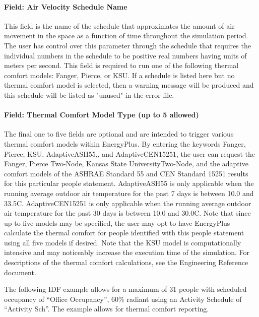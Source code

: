 \paragraph{Field: Air Velocity Schedule Name}\label{field-air-velocity-schedule-name}

This field is the name of the schedule that approximates the amount of air movement in the space as a function of time throughout the simulation period. The user has control over this parameter through the schedule that requires the individual numbers in the schedule to be positive real numbers having units of meters per second. This field is required to run one of the following thermal comfort models: Fanger, Pierce, or KSU. If a schedule is listed here but no thermal comfort model is selected, then a warning message will be produced and this schedule will be listed as "unused" in the error file.

\paragraph{Field: Thermal Comfort Model Type (up to 5 allowed)}\label{field-thermal-comfort-model-type-up-to-5-allowed}

The final one to five fields are optional and are intended to trigger various thermal comfort models within EnergyPlus. By entering the keywords Fanger, Pierce, KSU, AdaptiveASH55,, and AdaptiveCEN15251, the user can request the Fanger, Pierce Two-Node, Kansas State UniversityTwo-Node, and the adaptive comfort models of the ASHRAE Standard 55 and CEN Standard 15251 results for this particular people statement. AdaptiveASH55 is only applicable when the running average outdoor air temperature for the past 7 days is between 10.0 and 33.5C. AdaptiveCEN15251 is only applicable when the running average outdoor air temperature for the past 30 days is between 10.0 and 30.0C. Note that since up to five models may be specified, the user may opt to have EnergyPlus calculate the thermal comfort for people identified with this people statement using all five models if desired. Note that the KSU model is computationally intensive and may noticeably increase the execution time of the simulation. For descriptions of the thermal comfort calculations, see the Engineering Reference document.

The following IDF example allows for a maximum of 31 people with scheduled occupancy of ``Office Occupancy'', 60\% radiant using an Activity Schedule of ``Activity Sch''. The example allows for thermal comfort reporting.

